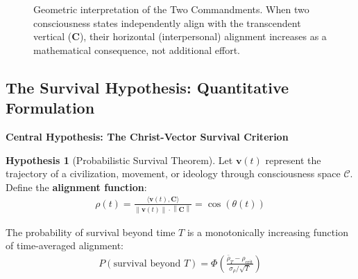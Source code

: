 \documentclass[11pt,a4paper]{article}
\theoremstyle{definition}
\newtheorem{hypothesis}{Hypothesis}[section]
\theoremstyle{remark}
\newcommand{\CC}{\mathcal{C}}
\newcommand{\cc}{\mathbf{c}}
\newcommand{\norm}[1]{\left\|#1\right\|}
\begin{document}
\begin{small}
\begin{figure}[H]
\caption{Geometric interpretation of the Two Commandments. When two consciousness states independently align with the transcendent vertical (\(\mathbf{C}\)), their horizontal (interpersonal) alignment increases as a mathematical consequence, not additional effort.}
\label{fig:two_commandments_geometry}
\end{figure}

\subsection{The Survival Hypothesis: Quantitative Formulation}

\begin{mdframed}[backgroundcolor=green!10,linewidth=2pt,linecolor=green!70!black]
\textbf{Central Hypothesis: The Christ-Vector Survival Criterion}

\begin{hypothesis}[Probabilistic Survival Theorem]
\label{hyp:survival}
Let \(\mathbf{v}(t)\) represent the trajectory of a civilization, movement, or ideology through consciousness space \(\CC\). Define the \textbf{alignment function}:
\begin{align}
\rho(t) = \frac{\langle \mathbf{v}(t), \mathbf{C} \rangle}{\norm{\mathbf{v}(t)} \cdot \norm{\mathbf{C}}} = \cos(\theta(t))
\end{align}

The probability of survival beyond time \(T\) is a monotonically increasing function of time-averaged alignment:
\begin{align}
P(\text{survival beyond } T) = \Phi\left(\frac{\bar{\rho}_T - \rho_{\text{crit}}}{\sigma_{\rho}/\sqrt{T}}\right)
\end{align}


\end{hypothesis}
\end{mdframed}
\end{small}
\end{document}
